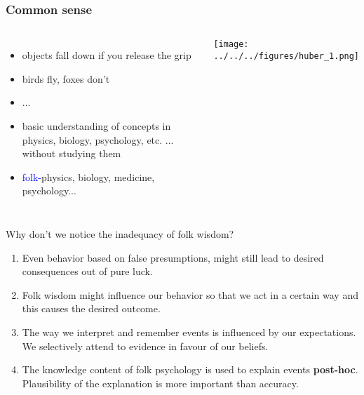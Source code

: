 \documentclass[]{beamer}
\begin{document}
\begin{frame}
 \frametitle{Common sense}
\begin{overlayarea}{110mm}{90mm}
\begin{columns}[c]
 \column[c]{10cm}
  \begin{itemize}
 \setlength{\itemsep}{5pt}
   \item objects fall down if you release the grip
   \item birds fly, foxes don't
   \item[] ...
   \item<2->[$\rightarrow$] basic understanding of concepts in physics, biology, psychology, etc. ... without studying them \item<2-> \textcolor{blue}{folk-}physics, biology, medicine, psychology...
  \end{itemize}
 \column{2cm}
  \texttt{[image: ../../../figures/huber\_1.png]}
\end{columns}

\vspace{4mm}
\end{overlayarea}
\end{frame}

\begin{frame}{Why don't we notice the inadequacy of folk wisdom?}
\begin{overlayarea}{110mm}{70mm}
  \begin{enumerate}[<+->]
\setlength{\itemsep}{10pt}
   \item Even behavior based on false presumptions, might still
lead to desired consequences out of pure luck.
   \item Folk wisdom might influence our behavior so that we act in a
certain way and this causes the desired outcome.
   \item The way we interpret and remember events is influenced by our expectations. We selectively attend to evidence in favour of our beliefs. 
   

   \item The knowledge content of folk psychology is used to explain events
\textbf{post-hoc}. Plausibility of the explanation is more important than accuracy. 
  \end{enumerate}
\end{overlayarea}
\end{frame}
\end{document}
